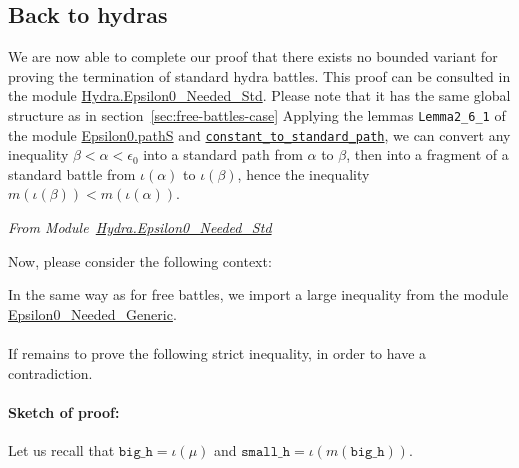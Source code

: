 \subsection{Back to hydras}
\label{sec:standard-battles-cases}
We are now able to complete our proof that there exists no bounded variant for proving the termination of standard hydra battles. This proof can
be consulted in the module 
\href{../theories/html/hydras.Hydra.Epsilon0_Needed_Std.html}{Hydra.Epsilon0\_Needed\_Std}.
Please note that it has the same global structure as in section~\ref{sec:free-battles-case} 
Applying the  lemmas  \texttt{Lemma2\_6\_1} of the module 
\href{../theories/html/hydras.Epsilon0.Paths.html\#Lemma2_6_1}%
{Epsilon0.pathS}   and 
\href{../theories/html/hydras.Epsilon0.Paths.html\#constant_to_standard_path}%
{\texttt{constant\_to\_standard\_path}},
we can convert any inequality $\beta<\alpha<\epsilon_0$ into a standard path from
$\alpha$ to  $\beta$, then into a fragment of a standard battle from 
$\iota(\alpha)$ to $\iota(\beta)$, hence the inequality $m(\iota(\beta))<m(\iota(\alpha))$.


\vspace{4pt}
\emph{From Module~\href{../theories/html/hydras.Hydra.Epsilon0_Needed_Std.html\#LT_to_standard_battle}{Hydra.Epsilon0\_Needed\_Std}}




Now, please consider the following context:



In the same way as for free battles, we import a large inequality 
from 
the module \href{../theories/html/hydras.Hydra.Epsilon0_Needed_Generic.html}{Epsilon0\_Needed\_Generic}.





\paragraph*{} If remains to prove the following strict inequality, in order to have a contradiction.




\paragraph*{Sketch of proof:} Let us recall that $\texttt{big\_h} = \iota(\mu)$
 and $\texttt{small\_h} = \iota (m (\texttt{big\_h}))$.

